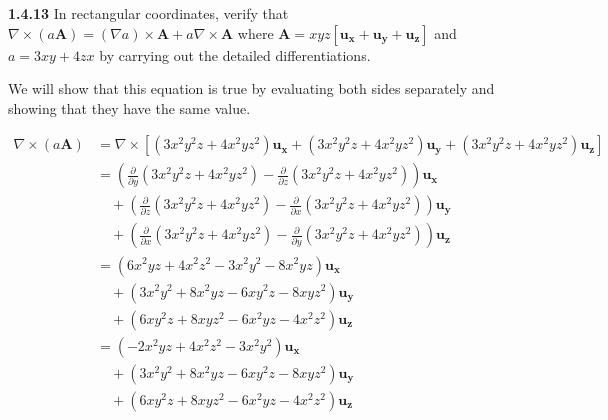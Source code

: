 \documentclass{article}
\begin{document}
\textbf{1.4.13} In rectangular coordinates, verify that $\nabla \times (a\mathbf{A}) = (\nabla a) \times \mathbf{A} +
	a\nabla \times \mathbf{A}$ where $\mathbf{A} = xyz[\mathbf{u_x} + \mathbf{u_y} + \mathbf{u_z}]$ and $a = 3xy + 4zx$ by
carrying out the detailed differentiations.

\vspace{24pt}

We will show that this equation is true by evaluating both sides separately and showing that they have the same value.

\begin{equation*}
	\begin{split}
		\nabla \times (a\mathbf{A}) & = \nabla \times \left[
			(3x^2y^2z + 4x^2yz^2)\mathbf{u_x} + (3x^2y^2z + 4x^2yz^2)\mathbf{u_y} + (3x^2y^2z + 4x^2yz^2)\mathbf{u_z}
			\right] \\
		& = \left(
		\frac{\partial}{\partial y}(3x^2y^2z + 4x^2yz^2) - \frac{\partial}{\partial z}(3x^2y^2z + 4x^2yz^2)
		\right)\mathbf{u_x} \\
		& \quad + \left(
		\frac{\partial}{\partial z}(3x^2y^2z + 4x^2yz^2) - \frac{\partial}{\partial x}(3x^2y^2z + 4x^2yz^2)
		\right)\mathbf{u_y} \\
		& \quad + \left(
		\frac{\partial}{\partial x}(3x^2y^2z + 4x^2yz^2) - \frac{\partial}{\partial y}(3x^2y^2z + 4x^2yz^2)
		\right)\mathbf{u_z} \\
		& = (6x^2yz + 4x^2z^2 - 3x^2y^2 - 8x^2yz)\mathbf{u_x} \\
		& \quad + (3x^2y^2 + 8x^2yz - 6xy^2z - 8xyz^2)\mathbf{u_y} \\
		& \quad + (6xy^2z + 8xyz^2 - 6x^2yz - 4x^2z^2)\mathbf{u_z} \\
		& = (-2x^2yz + 4x^2z^2 - 3x^2y^2)\mathbf{u_x} \\
		& \quad + (3x^2y^2 + 8x^2yz - 6xy^2z - 8xyz^2)\mathbf{u_y} \\
		& \quad + (6xy^2z + 8xyz^2 - 6x^2yz - 4x^2z^2)\mathbf{u_z}
	\end{split}
\end{equation*}
\end{document}

